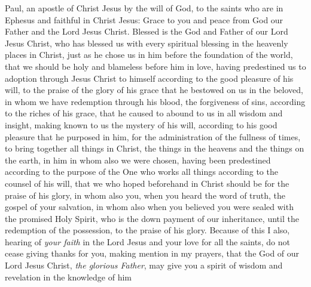 
\begin{biblechapter} %
 Paul, an apostle of Christ Jesus by the will of God, to the saints who are in Ephesus and faithful in Christ Jesus:
\verse Grace to you and peace from God our Father and the Lord Jesus Christ.
 Blessed is the God and Father of our Lord Jesus Christ, who has blessed us with every spiritual blessing in the heavenly places in Christ,
\verse just as he chose us in him before the foundation of the world, that we should be holy and blameless before him in love,
\verse having predestined us to adoption through Jesus Christ to himself according to the good pleasure of his will,
\verse to the praise of the glory of his grace that he bestowed on us in the beloved,
\verse in whom we have redemption through his blood, the forgiveness of sins, according to the riches of his grace,
\verse that he caused to abound to us in all wisdom and insight,
\verse making known to us the mystery of his will, according to his good pleasure that he purposed in him,
\verse for the administration of the fullness of times, to bring together all things in Christ, the things in the heavens and the things on the earth, in him
\verse in whom also we were chosen, having been predestined according to the purpose of the One who works all things according to the counsel of his will,
\verse that we who hoped beforehand in Christ should be for the praise of his glory,
\verse in whom also you, when you heard the word of truth, the gospel of your salvation, in whom also when you believed you were sealed with the promised Holy Spirit,
\verse who is the down payment of our inheritance, until the redemption of the possession, to the praise of his glory.
 Because of this I also, hearing of \textit{your faith} in the Lord Jesus and your love for all the saints,
\verse do not cease giving thanks for you, making mention in my prayers,
\verse that the God of our Lord Jesus Christ, \textit{the glorious Father}, may give you a spirit of wisdom and revelation in the knowledge of him

\end{biblechapter}
